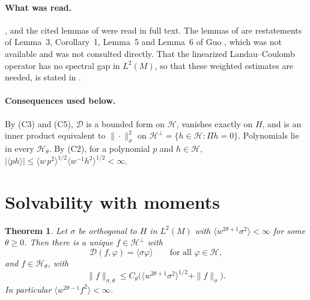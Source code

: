\documentclass[11pt]{article}
\newcommand{\cD}{\mathcal{D}}
\newcommand{\cH}{\mathcal{H}}
\newcommand{\avg}[1]{\langle #1\rangle}
\newtheorem{theorem}{Theorem}
\theoremstyle{remark}
\begin{document}
\paragraph{What was read.} \cite{Mouhot}, \cite{StrainGuo} and the cited
lemmas of \cite{KGH} were read in full text. The lemmas of \cite{KGH} are
restatements of Lemma~3, Corollary~1, Lemma~5 and Lemma~6 of Guo
\cite{Guo02}, which was not available and was not consulted directly. That
the linearized Landau--Coulomb operator has no spectral gap in $L^2(M)$, so
that these weighted estimates are needed, is stated in \cite{CM}.

\paragraph{Consequences used below.} By (C3) and (C5), $\cD$ is a bounded
form on $\cH$, vanishes exactly on $H$, and is an inner product equivalent to
$\|\cdot\|^2_\sigma$ on $\cH^\perp=\{h\in\cH:\Pi h=0\}$. Polynomials lie in
every $\cH_\theta$. By (C2), for a polynomial $p$ and $h\in\cH$,
$|\avg{ph}|\le\avg{w\,p^2}^{1/2}\avg{w^{-1}h^2}^{1/2}<\infty$.

\section{Solvability with moments}

\begin{theorem}\label{thm:solv}
Let $\sigma$ be orthogonal to $H$ in $L^2(M)$ with
$\avg{w^{2\theta+1}\sigma^2}<\infty$ for some $\theta\ge0$. Then there is a
unique $f\in\cH^\perp$ with
\begin{equation}
  \cD(f,\varphi)=\avg{\sigma\varphi}\qquad\text{for all }\varphi\in\cH ,
  \label{eq:weak}
\end{equation}
and $f\in\cH_\theta$, with
\[
  \|f\|_{\sigma,\theta}\le C_\theta\bigl(\avg{w^{2\theta+1}\sigma^2}^{1/2}
  +\|f\|_\sigma\bigr).
\]
In particular $\avg{w^{2\theta-1}f^2}<\infty$.
\end{theorem}
\end{document}
